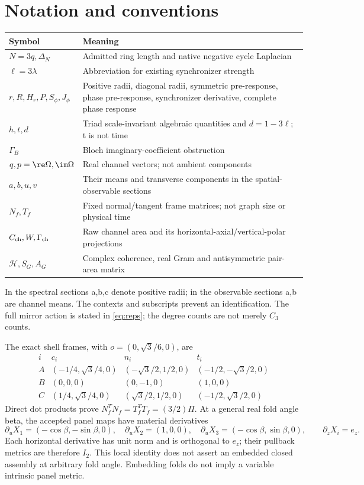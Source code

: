 \section{Notation and conventions}\label{app:notation}
\begin{center}\small
\begin{tabularx}{\linewidth}{@{}lX@{}}\toprule
Symbol & Meaning\\\midrule
\(N=3q,\Delta_N\)& Admitted ring length and native negative cycle Laplacian\\
\(\ell=3\lambda\)& Abbreviation for existing synchronizer strength\\
\(r,R,H_r,P,S_\phi,J_\phi\)& Positive radii, diagonal radii, symmetric pre-response, phase pre-response, synchronizer derivative, complete phase response\\
\(h,t,d\)& Triad scale-invariant algebraic quantities and \(d=1-3\ell\); t is not time\\
\(\Gamma_B\)& Bloch imaginary-coefficient obstruction\\
\(q,p= \re\Omega,\im\Omega\)& Real channel vectors; not ambient components\\
\(a,b,u,v\)& Their means and transverse components in the spatial-observable sections\\
\(N_f,T_f\)& Fixed normal/tangent frame matrices; not graph size or physical time\\
\(C_{\rm ch},W,\Gamma_{\rm ch}\)& Raw channel area and its horizontal-axial/vertical-polar projections\\
\(\mathcal H,S_G,A_G\)& Complex coherence, real Gram and antisymmetric pair-area matrix\\\bottomrule
\end{tabularx}
\end{center}
In the spectral sections a,b,c denote positive radii; in the observable sections a,b are channel means. The contexts and subscripts prevent an identification. The full mirror action is stated in \eqref{eq:reps}; the degree counts are not merely \(C_3\) counts.

The exact shell frames, with \(o=(0,\sqrt3/6,0)\), are
\[
\begin{array}{c|c|c|c}
i&c_i&n_i&t_i\\\hline
A&(-1/4,\sqrt3/4,0)&(-\sqrt3/2,1/2,0)&(-1/2,-\sqrt3/2,0)\\
B&(0,0,0)&(0,-1,0)&(1,0,0)\\
C&(1/4,\sqrt3/4,0)&(\sqrt3/2,1/2,0)&(-1/2,\sqrt3/2,0)
\end{array}
\]
Direct dot products prove \(N_f^TN_f=T_f^TT_f=(3/2)\Pi\). At a general real fold angle beta, the accepted panel maps have material derivatives
\[
\partial_uX_1=(-\cos\beta,-\sin\beta,0),\quad
\partial_uX_2=(1,0,0),\quad
\partial_uX_3=(-\cos\beta,\sin\beta,0),\qquad
\partial_zX_i=e_z.
\]
Each horizontal derivative has unit norm and is orthogonal to \(e_z\); their pullback metrics are therefore \(I_2\). This local identity does not assert an embedded closed assembly at arbitrary fold angle. Embedding folds do not imply a variable intrinsic panel metric.

